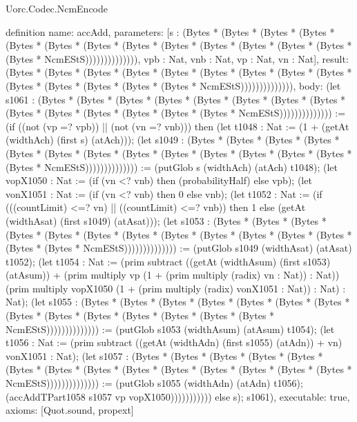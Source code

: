 \begin{lexlean}{Uorc.Codec.NcmEncode}
\begin{semanticmodule}
definition{
  name: accAdd,
  parameters: [s : (Bytes * (Bytes * (Bytes * (Bytes * (Bytes * (Bytes * (Bytes * (Bytes * (Bytes * (Bytes * (Bytes * (Bytes * (Bytes * (Bytes * NcmEStS)))))))))))))), vpb : Nat, vnb : Nat, vp : Nat, vn : Nat],
  result: (Bytes * (Bytes * (Bytes * (Bytes * (Bytes * (Bytes * (Bytes * (Bytes * (Bytes * (Bytes * (Bytes * (Bytes * (Bytes * (Bytes * NcmEStS)))))))))))))),
  body: (let s1061 : (Bytes * (Bytes * (Bytes * (Bytes * (Bytes * (Bytes * (Bytes * (Bytes * (Bytes * (Bytes * (Bytes * (Bytes * (Bytes * (Bytes * NcmEStS)))))))))))))) := (if ((not (vp =? vpb)) || (not (vn =? vnb))) then (let t1048 : Nat := (1 + (getAt (widthAch) (first s) (atAch))); (let s1049 : (Bytes * (Bytes * (Bytes * (Bytes * (Bytes * (Bytes * (Bytes * (Bytes * (Bytes * (Bytes * (Bytes * (Bytes * (Bytes * (Bytes * NcmEStS)))))))))))))) := (putGlob s (widthAch) (atAch) t1048); (let vopX1050 : Nat := (if (vn <? vnb) then (probabilityHalf) else vpb); (let vonX1051 : Nat := (if (vn <? vnb) then 0 else vnb); (let t1052 : Nat := (if (((countLimit) <=? vn) || ((countLimit) <=? vnb)) then 1 else (getAt (widthAsat) (first s1049) (atAsat))); (let s1053 : (Bytes * (Bytes * (Bytes * (Bytes * (Bytes * (Bytes * (Bytes * (Bytes * (Bytes * (Bytes * (Bytes * (Bytes * (Bytes * (Bytes * NcmEStS)))))))))))))) := (putGlob s1049 (widthAsat) (atAsat) t1052); (let t1054 : Nat := (prim subtract ((getAt (widthAsum) (first s1053) (atAsum)) + (prim multiply vp (1 + (prim multiply (radix) vn : Nat)) : Nat)) (prim multiply vopX1050 (1 + (prim multiply (radix) vonX1051 : Nat)) : Nat) : Nat); (let s1055 : (Bytes * (Bytes * (Bytes * (Bytes * (Bytes * (Bytes * (Bytes * (Bytes * (Bytes * (Bytes * (Bytes * (Bytes * (Bytes * (Bytes * NcmEStS)))))))))))))) := (putGlob s1053 (widthAsum) (atAsum) t1054); (let t1056 : Nat := (prim subtract ((getAt (widthAdn) (first s1055) (atAdn)) + vn) vonX1051 : Nat); (let s1057 : (Bytes * (Bytes * (Bytes * (Bytes * (Bytes * (Bytes * (Bytes * (Bytes * (Bytes * (Bytes * (Bytes * (Bytes * (Bytes * (Bytes * NcmEStS)))))))))))))) := (putGlob s1055 (widthAdn) (atAdn) t1056); (accAddTPart1058 s1057 vp vopX1050))))))))))) else s); s1061),
  executable: true,
  axioms: [Quot.sound, propext]
}


\end{semanticmodule}
\end{lexlean}
